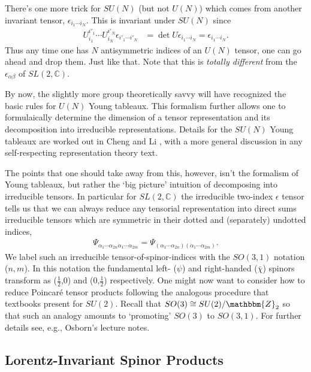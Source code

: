 \documentclass[12pt, oneside]{report}    %
\begin{document}
There's one more trick for $SU(N)$ (but not $U(N)$) which comes from another invariant tensor, $\epsilon_{i_1\cdots i_N}$. This is invariant under $SU(N)$ since
\begin{align}
    U_{i_1}^{i'_1}\cdots U_{i_N}^{i'_N} \epsilon_{i'_1\cdots i'_N} &= \det U \epsilon_{i_1\cdots i_N} = \epsilon_{i_1\cdots i_N}.
\end{align} 
Thus any time one has $N$ antisymmetric indices of an $U(N)$ tensor, one can go ahead and drop them. Just like that. 
Note that this is \textit{totally different} from the $\epsilon_{\alpha\beta}$ of $SL(2,\mathbb{C})$.

By now, the slightly more group theoretically savvy will have recognized the basic rules for $U(N)$ Young tableaux. This formalism further allows one to formulaically determine the dimension of a tensor representation and its decomposition into irreducible representations. Details for the $SU(N)$ Young tableaux are worked out in Cheng and Li \cite{chengandli}, with a more general discussion in any self-respecting representation theory text. 


The points that one should take away from this, however, isn't the formalism of Young tableaux, but rather the `big picture' intuition of decomposing into irreducible tensors. In particular for $SL(2,\mathbb{C})$ the irreducible two-index $\epsilon$ tensor tells us that we can always reduce any tensorial representation into direct sums irreducible tensors which are symmetric in their dotted and (separately) undotted indices,
\begin{align}
    \Psi_{\alpha_1\cdots\alpha_{2n} \dot\alpha_1\cdots\dot\alpha_{2m}} = 
    \Psi_{(\alpha_1\cdots\alpha_{2n}) (\dot\alpha_1\cdots\dot\alpha_{2m})}.
\end{align}
%
We label such an irreducible tensor-of-spinor-indices with the $SO(3,1)$ notation ($n,m$). In this notation the fundamental left- ($\psi$) and right-handed ($\bar\chi$) spinors transform as ($\frac 12$,0) and (0,$\frac 12$) respectively. One might now want to consider how to reduce Poincar\'e tensor products following the analogous procedure that textbooks present for $SU(2)$. Recall that $SO(3)\cong SU(2)/\mathbbm{Z}_2$ so that such an analogy amounts to `promoting' $SO(3)$ to $SO(3,1)$. For further details see, e.g., Osborn's lecture notes\autocite{Osborn:Symmetries}.

\subsection{Lorentz-Invariant Spinor Products}
\end{document}
